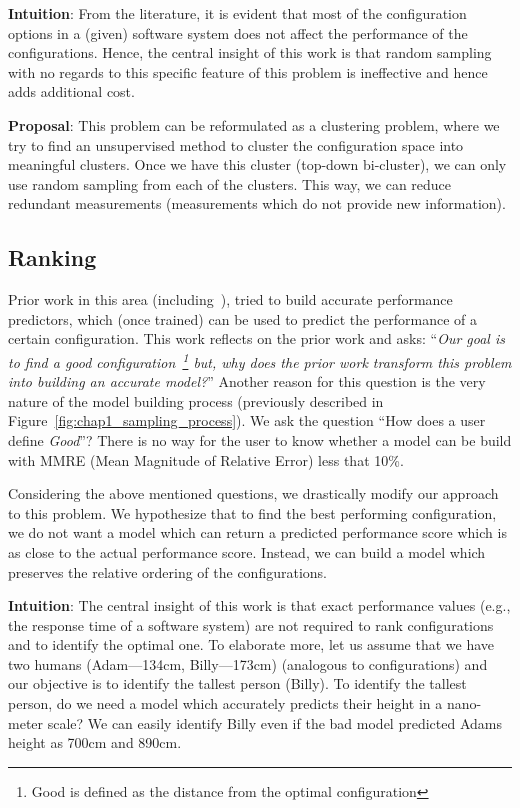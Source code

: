 \noindent\textbf{Intuition}: From the literature, it is evident that most of the configuration options in a (given) software system does not affect the performance of the configurations. Hence, the central insight of this work is that random sampling with no regards to this specific feature of this problem is ineffective and hence adds additional cost. 

\noindent\textbf{Proposal}: This problem can be reformulated as a clustering problem, where we try to find an unsupervised method to cluster the configuration space into meaningful clusters. Once we have this cluster (top-down bi-cluster), we can only use random sampling from each of the clusters. This way, we can reduce redundant measurements (measurements which do not provide new information).  

\subsection{Ranking}
Prior work in this area (including~\cite{nair2017faster}), tried to build accurate performance predictors, which (once trained) can be used to predict the performance of a certain configuration. This work reflects on the prior work and asks: ``\textit{Our goal is to find a good configuration~\footnote{Good is defined as the distance from the optimal configuration} but, why does the prior work transform this problem into building an accurate model?}'' Another reason for this question is the very nature of the model building process (previously described in Figure~\ref{fig:chap1_sampling_process}). We ask the question ``How does a user define \textit{Good}''? There is no way for the user to know whether a model can be build with MMRE (Mean Magnitude of Relative Error) less that 10\%. 

Considering the above mentioned questions, we drastically modify our approach to this problem. We hypothesize that to find the best performing configuration, we do not want a model which can return a predicted performance score which is as close to the actual performance score. Instead, we can build a model which preserves the relative ordering of the configurations. 

\noindent\textbf{Intuition}: The central insight of this work is that exact performance
values (e.g., the response time of a software system) are not
required to rank configurations and to identify the optimal one. To elaborate more, let us assume that we have two humans (Adam---134cm, Billy---173cm) (analogous to configurations) and our objective is to identify the tallest person (Billy). To identify the tallest person, do we need a model which accurately predicts their height in a nano-meter scale? We can easily identify Billy even if the bad model predicted Adams height as 700cm and 890cm. 

